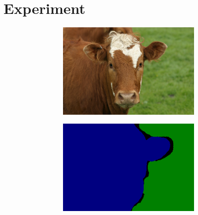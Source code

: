 \documentclass{article} %
\begin{document}
\section{Experiment}

\begin{figure}
	\centering
	\begin{subfigure}[c]{\textwidth}
		\centering
		\begin{subfigure}[c]{0.195\textwidth}
			\includegraphics[width = \textwidth]{./img/1_22_s.png}
			\label{fig:1_22_s}
		\end{subfigure}
		\begin{subfigure}[c]{0.195\textwidth}
			\includegraphics[width = \textwidth]{./img/1_22_s_GT.png}
			\label{fig:1_22_s_lab}
		\end{subfigure}
		\begin{subfigure}[c]{0.195\textwidth}

\end{subfigure}
\end{subfigure}
\end{figure}
\end{document}
